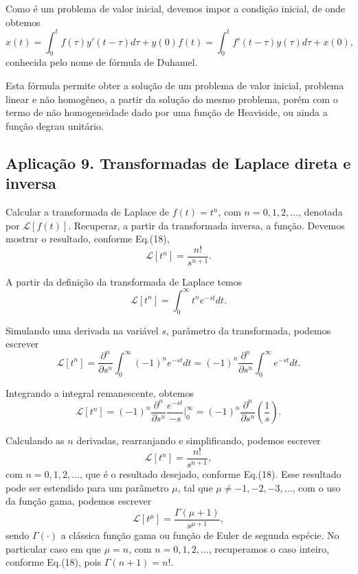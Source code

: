 Como é um problema de valor inicial, devemos impor a condição inicial, de onde obtemos
$$x(t) =
\int_{0}^{t}
f(\tau)y'(t - \tau) d\tau + y(0)f(t)
=
\int_{0}^{t}
f'(t - \tau) y(\tau) d\tau + x(0),$$
conhecida pelo nome de fórmula de Duhamel.

Esta fórmula permite obter a solução de um problema de valor inicial, problema linear e não homogêneo, a partir da solução do mesmo problema, porém com o termo de não homogeneidade dado por uma função de Heaviside, ou ainda a função degrau unitário.

\subsection{Aplicação 9. Transformadas de Laplace direta e inversa}


Calcular a transformada de Laplace de $f(t) = t^{n}$, com $n = 0, 1, 2, \ldots$, denotada por $\mathscr{L}[f(t)]$. Recuperar, a partir da transformada inversa, a função. Devemos mostrar o resultado, conforme Eq.(18),
$$\mathscr{L}[t^{n}] =
\dfrac{n!}{s^{n+1}}.$$

A partir da definição da transformada de Laplace temos
$$\mathscr{L}[t^{n}] =
\int_{0}^{\infty}
t^{n} e^{-st} dt.$$

Simulando uma derivada na variável $s$, parâmetro da transformada, podemos escrever
$$\mathscr{L}[t^{n}] =
\dfrac{\partial^n}{\partial s^{n}}
\int_{0}^{\infty}
(-1)^n e^{-st} dt = (-1)^n \dfrac{\partial^n}{\partial s^{n}}
\int_{0}^{\infty}
e^{-st} dt.$$

Integrando a integral remanescente, obtemos
$$\mathscr{L}[t^{n}] = (-1)^n \dfrac{\partial^n}{\partial s^{n}}
\dfrac{e^{-st}}{-s}
\Bigg|_{0}^{\infty}
= (-1)^n \dfrac{\partial^n}{\partial s^{n}}
\left(
\dfrac{1}{s}
\right).$$

Calculando as $n$ derivadas, rearranjando e simplificando, podemos escrever
$$\mathscr{L}[t^{n}] = \dfrac{n!}{s^{n+1}},$$
com $n = 0, 1, 2, \ldots$, que é o resultado desejado, conforme Eq.(18). Esse resultado pode ser estendido para um parâmetro $\mu$, tal que $\mu \ne -1, -2, -3, \ldots$, com o uso da função gama, podemos escrever
\begin{equation}\label{eq:aula04.23}
\mathscr{L}[t^{\mu}] =
\dfrac{\Gamma(\mu + 1)}{s^{\mu+1}},
\end{equation}
sendo $\Gamma(\cdot)$ a clássica função gama ou função de Euler de segunda espécie. No particular caso em que $\mu = n$, com $n = 0, 1, 2, \ldots$, recuperamos o caso inteiro, conforme Eq.(18), pois $\Gamma(n + 1) = n!$.

